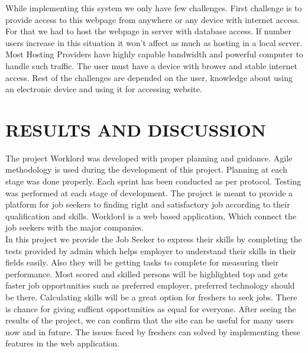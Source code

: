 \documentclass[a4paper,12pt]{report}
\begin{document}
While implementing this system we only have few challenges. First challenge is to provide access to this webpage from anywhere or any device with internet access. For that we had to host the webpage in server with database access. If number users increase in this situation it won't affect as much as hosting in a local server. Most Hosting Providers have highly capable bandwidth and powerful computer to handle such traffic. The user must have a device with brower and stable internet access. Rest of the challenges are depended on the user, knowledge about using an electronic device and using it for accessing website. \\

\pagebreak

\chapter{RESULTS AND DISCUSSION}

The project Worklord was developed with proper planning and guidance. Agile methodology is used during the development of this project. Planning at each stage was done properly. Each sprint has been conducted as per protocol. Testing was performed at each stage of development. The project is meant to provide a platform for job seekers to  finding right and satisfactory job according to their qualification and skills. Worklord is a web based application, Which connect the job seekers with the major companies.\\

 In this project we provide the Job Seeker to express
their skills by completing the tests provided by admin which helps employer to understand
their skills in their fields easily. Also they will be getting tasks to complete for measuring
their performance. Most scored and skilled persons will be highlighted top and gets faster job
opportunities such as preferred employer, preferred technology should be there. Calculating skills will be a great option for freshers to seek jobs. There is chance for giving suffient opportunities as equal for everyone. After seeing the results of the project, we can confirm that the site can be useful for many users now and in future. The issues faced by freshers can
solved by implementing these features in the web application.
\pagebreak
\end{document}
